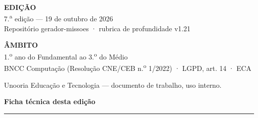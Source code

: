 \documentclass[11pt,a4paper]{article}
\newcommand{\cod}[1]{{\ttfamily\small #1}}
\begin{document}
\begin{titlepage}
\noindent
\begin{minipage}[t]{0.49\textwidth}
{\sffamily\footnotesize\color{unAzul}\bfseries EDIÇÃO}\\[0.25em]
{\color{white}\small 7.\textsuperscript{a} edição --- 19 de outubro de 2026\\
Repositório \cod{gerador-missoes} · rubrica de profundidade v1.21}
\end{minipage}\hfill
\begin{minipage}[t]{0.47\textwidth}
{\sffamily\footnotesize\color{unAzul}\bfseries ÂMBITO}\\[0.25em]
{\color{white}\small 1.\textsuperscript{o} ano do Fundamental ao 3.\textsuperscript{o} do Médio\\
BNCC Computação (Resolução CNE/CEB n.\textsuperscript{o} 1/2022) · LGPD, art. 14 · ECA}
\end{minipage}

\vspace{1.4em}
{\noindent\color{unLavanda}\scriptsize Unooria Educação e Tecnologia --- documento de trabalho, uso interno.}
\end{titlepage}

\thispagestyle{empty}
\null\vspace*{-0.6cm}

{\sffamily\color{unNavy}\Large\bfseries Ficha técnica desta edição}\\[0.3em]
{\color{unLavanda}\rule{3.2cm}{1.6pt}}
\end{document}
